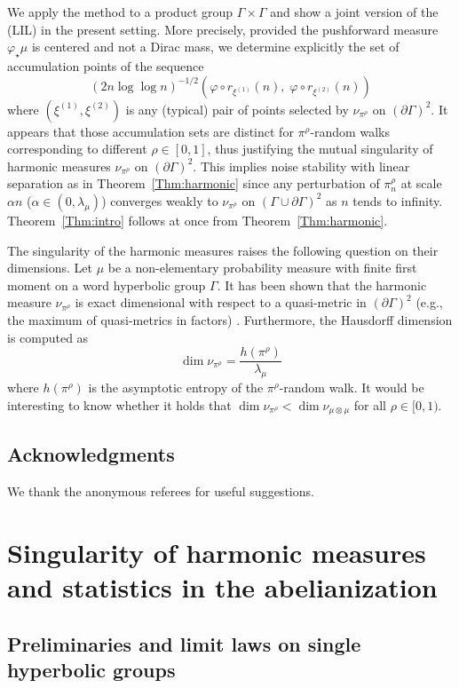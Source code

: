 \documentclass[10pt]{amsart}
\theoremstyle{definition}\newtheorem{defi}[theo]{Definition}\newtheorem{rema}[theo]{Remark}\newtheorem{exam}[theo]{Example}\newtheorem{exem}[theo]{Example}\newtheorem{nota}[theo]{Notation}
\newcommand{\f}{\varphi}
\renewcommand{\(}{\left(}
\renewcommand{\)}{\right)}
\begin{document}
We apply the method to a product group $\Gamma \times \Gamma$ and show a joint version of the (LIL) in the present setting. More precisely, provided the pushforward measure $\varphi_{\star}\mu$ is centered and not a Dirac mass, we determine explicitly the set of accumulation points of the sequence
\[
(2n \log \log n)^{-1/2}\left(\f \circ r_{\xi^{(1)}}(n),\; \f \circ r_{\xi^{(2)}}(n)\right)
\]
where $(\xi^{(1)}, \xi^{(2)})$ is any (typical) pair of points selected by $\nu_{\pi^\rho}$ on $(\partial \Gamma)^2$. It appears that those accumulation sets are distinct for $\pi^\rho$-random walks corresponding to different $\rho \in [0, 1]$, thus justifying the mutual singularity of harmonic measures $\nu_{\pi^\rho}$ on $(\partial \Gamma)^2$. This implies noise stability with linear separation as in Theorem~\ref{Thm:harmonic} since any perturbation of $\pi^\rho_n$ at scale $\alpha n$ ($\alpha\in (0, \lambda_{\mu})$) converges weakly to $\nu_{\pi^\rho}$ on $(\Gamma \cup \partial \Gamma)^2$ as $n$ tends to infinity. Theorem~\ref{Thm:intro} follows at once from Theorem~\ref{Thm:harmonic}.


The singularity of the harmonic measures raises the following question on their dimensions. Let $\mu$ be a non-elementary probability measure with finite first moment on a word hyperbolic group $\Gamma$. It has been shown that the harmonic measure $\nu_{\pi^\rho}$ is exact dimensional with respect to a quasi-metric in $(\partial \Gamma)^2$ (e.g., the maximum of quasi-metrics in factors) \cite[Theorem~3.1]{NonNS}. Furthermore, the Hausdorff dimension is computed as
\[
\dim \nu_{\pi^\rho}=\frac{h(\pi^\rho)}{\lambda_\mu}
\]
where $h(\pi^\rho)$ is the asymptotic entropy of the $\pi^\rho$-random walk. It would be interesting to know whether it holds that $\dim \nu_{\pi^\rho}<\dim \nu_{\mu\otimes \mu}$ for all $\rho \in [0, 1)$.

\subsection*{Acknowledgments}
We thank the anonymous referees for useful suggestions.


\section{Singularity of harmonic measures and statistics in the abelianization}

\subsection{Preliminaries and limit laws on single hyperbolic groups}\label{Sec:limit_laws}
\end{document}
